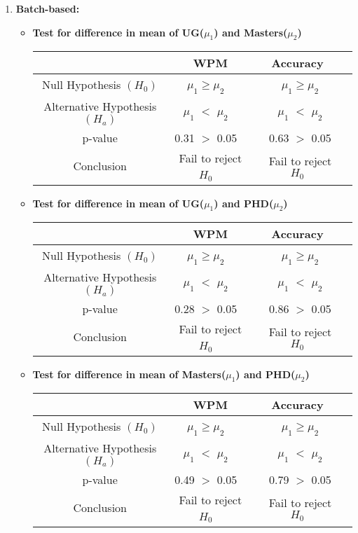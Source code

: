 \documentclass[12pt,a4paper]{report}
\begin{document}
\begin{enumerate}[label=\textbf{\arabic*})]
    \item \textbf{Batch-based:}
    \begin{itemize}
        \item \textbf{Test for difference in mean of UG($\mu_1$) and Masters($\mu_2$)}
     \begin{center}
    \begin{tabular}{ |c|c|c|c|}
      \hline
       & WPM & Accuracy \\
      \hline
      Null Hypothesis $(H_0)$ & $\mu_1  \geq \mu_2$ \ & \ $\mu_1  \geq \mu_2$ \\ 
      \hline
      Alternative Hypothesis $(H_a)$ & $\mu_1$ $<$ $\mu_2$ \ & \ $\mu_1$ $<$ $\mu_2$ \\
      \hline
      p-value & 0.31 $>$ 0.05 \ & \ 0.63 $>$ 0.05 \\
      \hline
      Conclusion & Fail to reject $H_0$ \ & \ Fail to reject $H_0$ \\
      \hline
    \end{tabular}
    \end{center}
    \vspace{2mm}
        \item \textbf{Test for difference in mean of UG($\mu_1$) and PHD($\mu_2$)}
    \begin{center}
    \begin{tabular}{ |c|c|c|c|}
      \hline
       & WPM & Accuracy \\
      \hline
      Null Hypothesis $(H_0)$ & $\mu_1  \geq \mu_2$ \ & \ $\mu_1  \geq \mu_2$ \\ 
      \hline
      Alternative Hypothesis $(H_a)$ & $\mu_1$ $<$ $\mu_2$ \ & \ $\mu_1$ $<$ $\mu_2$ \\
      \hline
      p-value & 0.28 $>$ 0.05 \ & \ 0.86 $>$ 0.05 \\
      \hline
      Conclusion & Fail to reject $H_0$ \ & \ Fail to reject $H_0$ \\
      \hline
    \end{tabular}
    \end{center}
    \vspace{2mm}
    
        \item \textbf{Test for difference in mean of Masters($\mu_1$) and PHD($\mu_2$)}
    \begin{center}
    \begin{tabular}{ |c|c|c|c|}
      \hline
       & WPM & Accuracy \\
      \hline
      Null Hypothesis $(H_0)$ & $\mu_1  \geq \mu_2$ \ & \ $\mu_1  \geq \mu_2$ \\ 
      \hline
      Alternative Hypothesis $(H_a)$ & $\mu_1$ $<$ $\mu_2$ \ & \ $\mu_1$ $<$ $\mu_2$ \\
      \hline
      p-value & 0.49 $>$ 0.05 \ & \ 0.79 $>$ 0.05 \\
      \hline
      Conclusion & Fail to reject $H_0$ \ & \ Fail to reject $H_0$ \\
      \hline
    \end{tabular}
    \end{center}
    \vspace{2mm}
        

\end{itemize}
\end{enumerate}
\end{document}
